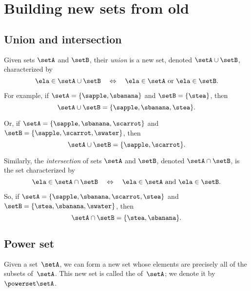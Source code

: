 
\section{Building new sets from old}



\subsection{Union and intersection}

Given sets $\setA$ and $\setB$, their \emph{union} is a new set, denoted $\setA \cup \setB$, characterized by 
\begin{equation*}
\ela \in \setA \cup \setB \quad \Leftrightarrow \quad \ela \in \setA \ \text{or} \ \ela \in \setB. 
\end{equation*}

For example, if $\setA = \{ \sapple, \sbanana \}$ and $\setB = \{ \stea \}$, then 
\begin{equation*}
\setA \cup \setB = \{ \sapple, \sbanana, \stea \}. 
\end{equation*}

Or, if $\setA = \{ \sapple, \sbanana, \scarrot \}$ and $\setB = \{ \sapple, \scarrot, \swater \}$, then
\begin{equation*}
\setA \cup \setB = \{ \sapple, \scarrot \}. 
\end{equation*}

Similarly, the \emph{intersection} of sets $\setA$ and $\setB$, denoted $\setA \cap \setB$, is the set characterized by 
\begin{equation*}
\ela \in \setA \cap \setB \quad \Leftrightarrow \quad \ela \in \setA \ \text{and} \ \ela \in \setB. 
\end{equation*}

So, if $\setA = \{ \sapple, \sbanana, \scarrot, \stea \}$ and $\setB = \{ \stea, \sbanana, \swater \}$, then
\begin{equation*}
\setA \cap \setB = \{ \stea, \sbanana \}. 
\end{equation*}

\subsection{Power set}
\label{sec:power-set}

Given a set~$\setA$, we can form a new set whose elements are precisely all of the subsets of~$\setA$.
This new set is called the  of~$\setA$; we denote it by~$\powerset \setA$.


